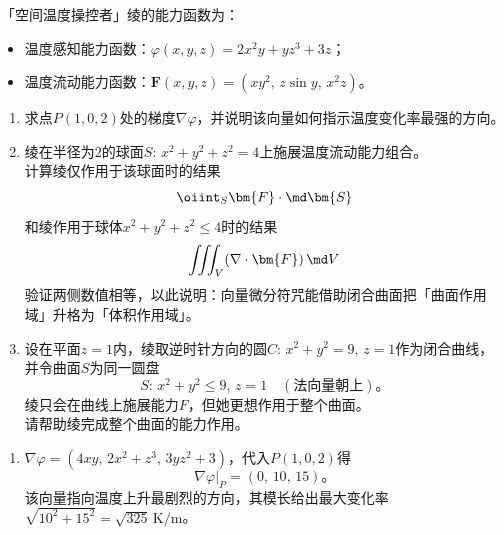 \begin{example}[向量微分符咒综合应用]

    「空间温度操控者」绫的能力函数为：
    \begin{itemize}
        \item 温度感知能力函数：$\varphi(x,y,z)=2x^{2}y+yz^{3}+3z$；
        \item 温度流动能力函数：$\bm{F}(x,y,z)=(xy^{2},\,z\sin y,\,x^{2}z)$。
    \end{itemize}

    \begin{enumerate}
        \item 求点$P(1,0,2)$处的梯度$\nabla\varphi$，并说明该向量如何指示温度变化率最强的方向。

        \item
              绫在半径为$2$的球面$S:\,x^{2}+y^{2}+z^{2}=4$上施展温度流动能力组合。\\
              计算绫仅作用于该球面时的结果
              \begin{equation}
                  \oiint_{S}\bm{F}\cdot\md\bm{S}
              \end{equation}
              和绫作用于球体$x^{2}+y^{2}+z^{2}\leq 4$时的结果
              \begin{equation}
                  \iiint_{V}(\nabla\cdot\bm{F})\,\md V
              \end{equation}
              验证两侧数值相等，以此说明：向量微分符咒能借助闭合曲面把「曲面作用域」升格为「体积作用域」。
        \item
              设在平面$z=1$内，绫取逆时针方向的圆$C:\,x^{2}+y^{2}=9,\,z=1$作为闭合曲线，并令曲面$S$为同一圆盘
              \begin{equation}
                  S:\,x^{2}+y^{2}\leq 9,\,z=1\quad(\text{法向量朝上})。
              \end{equation}
              绫只会在曲线上施展能力\(F\)，但她更想作用于整个曲面。\\
              请帮助绫完成整个曲面的能力作用。
    \end{enumerate}

    \solution
    \begin{enumerate}
        \item $\nabla\varphi=(4xy,\,2x^{2}+z^{3},\,3yz^{2}+3)$，代入$P(1,0,2)$得
              \begin{equation}
                  \nabla\varphi\big|_{P}=(0,\,10,\,15)。
              \end{equation}
              该向量指向温度上升最剧烈的方向，其模长给出最大变化率$\sqrt{10^{2}+15^{2}}=\sqrt{325}\,\mathrm{K/m}$。


\end{enumerate}
\end{example}
